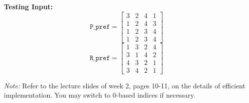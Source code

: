 \documentclass[12pt]{article}
\begin{document}
\textbf{Testing Input:}
\[
\texttt{P\_pref} = 
\begin{bmatrix}
3 & 2 & 4 & 1 \\
1 & 2 & 4 & 3 \\
1 & 2 & 3 & 4 \\
1 & 2 & 3 & 4
\end{bmatrix}
\]
\[
\texttt{R\_pref} = 
\begin{bmatrix}
1 & 3 & 2 & 4 \\
3 & 1 & 4 & 2 \\
4 & 3 & 2 & 1 \\
3 & 4 & 2 & 1
\end{bmatrix}
\]

\textit{Note:} Refer to the lecture slides of week 2, pages 10-11, on the details of efficient implementation. You may switch to 0-based indices if necessary.
\end{document}
